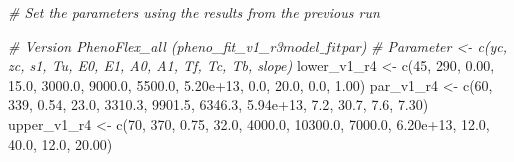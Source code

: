 \documentclass[
]{article}
\newenvironment{Shaded}{\begin{snugshade}}{\end{snugshade}}
\newcommand{\CommentTok}[1]{\textcolor[rgb]{0.56,0.35,0.01}{\textit{#1}}}
\newcommand{\DecValTok}[1]{\textcolor[rgb]{0.00,0.00,0.81}{#1}}
\newcommand{\FloatTok}[1]{\textcolor[rgb]{0.00,0.00,0.81}{#1}}
\newcommand{\FunctionTok}[1]{\textcolor[rgb]{0.00,0.00,0.00}{#1}}
\newcommand{\NormalTok}[1]{#1}
\newcommand{\OtherTok}[1]{\textcolor[rgb]{0.56,0.35,0.01}{#1}}
\begin{document}
\begin{Shaded}
\begin{Highlighting}[]
\CommentTok{\# Set the parameters using the results from the previous run}

\CommentTok{\# Version PhenoFlex\_all (pheno\_fit\_v1\_r3$model\_fit$par)}
\CommentTok{\# Parameter \textless{}{-} c(yc,  zc,   s1,   Tu,     E0,      E1,     A0,       A1,   Tf,   Tc,   Tb, slope)}
\NormalTok{lower\_v1\_r4 }\OtherTok{\textless{}{-}} \FunctionTok{c}\NormalTok{(}\DecValTok{45}\NormalTok{, }\DecValTok{290}\NormalTok{, }\FloatTok{0.00}\NormalTok{, }\FloatTok{15.0}\NormalTok{, }\FloatTok{3000.0}\NormalTok{,  }\FloatTok{9000.0}\NormalTok{, }\FloatTok{5500.0}\NormalTok{, }\FloatTok{5.20e+13}\NormalTok{,  }\FloatTok{0.0}\NormalTok{, }\FloatTok{20.0}\NormalTok{,  }\FloatTok{0.0}\NormalTok{,  }\FloatTok{1.00}\NormalTok{)}
\NormalTok{par\_v1\_r4   }\OtherTok{\textless{}{-}} \FunctionTok{c}\NormalTok{(}\DecValTok{60}\NormalTok{, }\DecValTok{339}\NormalTok{, }\FloatTok{0.54}\NormalTok{, }\FloatTok{23.0}\NormalTok{, }\FloatTok{3310.3}\NormalTok{,  }\FloatTok{9901.5}\NormalTok{, }\FloatTok{6346.3}\NormalTok{, }\FloatTok{5.94e+13}\NormalTok{,  }\FloatTok{7.2}\NormalTok{, }\FloatTok{30.7}\NormalTok{,  }\FloatTok{7.6}\NormalTok{,  }\FloatTok{7.30}\NormalTok{)}
\NormalTok{upper\_v1\_r4 }\OtherTok{\textless{}{-}} \FunctionTok{c}\NormalTok{(}\DecValTok{70}\NormalTok{, }\DecValTok{370}\NormalTok{, }\FloatTok{0.75}\NormalTok{, }\FloatTok{32.0}\NormalTok{, }\FloatTok{4000.0}\NormalTok{, }\FloatTok{10300.0}\NormalTok{, }\FloatTok{7000.0}\NormalTok{, }\FloatTok{6.20e+13}\NormalTok{, }\FloatTok{12.0}\NormalTok{, }\FloatTok{40.0}\NormalTok{, }\FloatTok{12.0}\NormalTok{, }\FloatTok{20.00}\NormalTok{)}



\end{Highlighting}
\end{Shaded}
\end{document}
